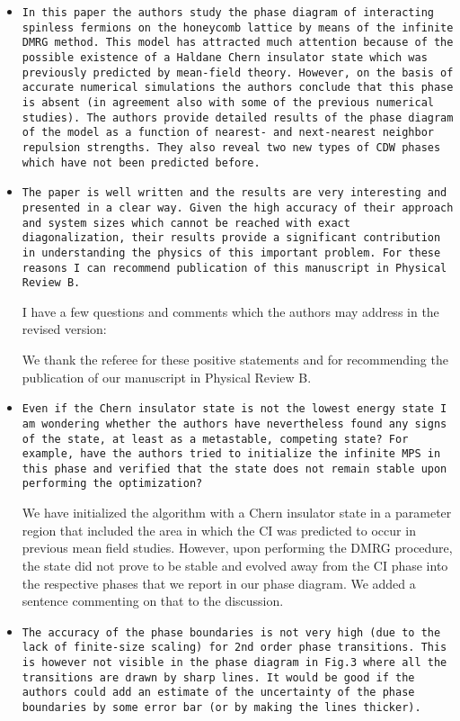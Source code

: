 \documentclass[aps,prb,superscriptaddress]{revtex4}
\begin{document}
\begin{itemize}

\item{\tt In this paper the authors study the phase diagram of interacting
spinless fermions on the honeycomb lattice by means of the infinite
DMRG method. This model has attracted much attention because of the
possible existence of a Haldane Chern insulator state which was
previously predicted by mean-field theory. However, on the basis of
accurate numerical simulations the authors conclude that this phase is
absent (in agreement also with some of the previous numerical
studies). The authors provide detailed results of the phase diagram of
the model as a function of nearest- and next-nearest neighbor
repulsion strengths. They also reveal two new types of CDW phases
which have not been predicted before.}

\item{\tt The paper is well written and the results are very interesting and
presented in a clear way. Given the high accuracy of their approach
and system sizes which cannot be reached with exact diagonalization,
their results provide a significant contribution in understanding the
physics of this important problem. For these reasons I can recommend
publication of this manuscript in Physical Review B.

I have a few questions and comments which the authors may address in
the revised version:}

We thank the referee for these positive statements and for recommending the publication of our manuscript in Physical Review B. 


\item{\tt Even if the Chern insulator state is not the lowest energy state I
am wondering whether the authors have nevertheless found any signs of
the state, at least as a metastable, competing state? For example,
have the authors tried to initialize the infinite MPS in this phase
and verified that the state does not remain stable upon performing the
optimization?}

We have initialized the algorithm with a Chern insulator state in a parameter region that included the area in which the CI was predicted to occur in previous mean field studies. However, upon performing the DMRG procedure, the state did not prove to be stable and evolved away from the CI phase into the respective phases that we report in our phase diagram. We added a sentence commenting on that to the discussion.
 
\item{\tt The accuracy of the phase boundaries is not very high (due to the
lack of finite-size scaling) for 2nd order phase transitions. This is
however not visible in the phase diagram in Fig.3 where all the
transitions are drawn by sharp lines. It would be good if the authors
could add an estimate of the uncertainty of the phase boundaries by
some error bar (or by making the lines thicker).}


\end{itemize}
\end{document}
